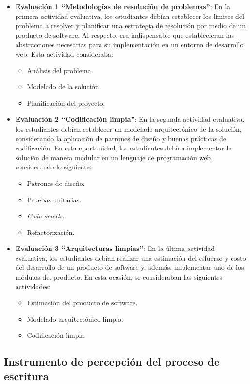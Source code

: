 \documentclass[spanish]{textolivre}
\begin{document}
\begin{itemize}
    \item \textbf{Evaluación 1 “Metodologías de resolución de problemas”}: En la primera actividad evaluativa, los estudiantes debían establecer los límites del problema a resolver y planificar una estrategia de resolución por medio de un producto de software. Al respecto, era indispensable que establecieran las abstracciones necesarias para su implementación en un entorno de desarrollo web. Esta actividad consideraba:
    \begin{itemize}
        \item Análisis del problema.
        \item Modelado de la solución.
        \item Planificación del proyecto.
    \end{itemize}
    \item \textbf{Evaluación 2 “Codificación limpia”}: En la segunda actividad evaluativa, los estudiantes debían establecer un modelado arquitectónico de la solución, considerando la aplicación de patrones de diseño y buenas prácticas de codificación. En esta oportunidad, los estudiantes debían implementar la solución de manera modular en un lenguaje de programación web, considerando lo siguiente:
    \begin{itemize}
        \item Patrones de diseño.
        \item Pruebas unitarias.
        \item \textit{Code smells}.
        \item Refactorización.
    \end{itemize}
    \item \textbf{Evaluación 3 “Arquitecturas limpias”}: En la última actividad evaluativa, los estudiantes debían realizar una estimación del esfuerzo y costo del desarrollo de un producto de software y, además, implementar uno de los módulos del producto. En esta ocasión, se consideraban las siguientes actividades:
    \begin{itemize}
        \item Estimación del producto de software.
        \item Modelado arquitectónico limpio.
        \item Codificación limpia.
    \end{itemize}
\end{itemize}

\subsection{Instrumento de percepción del proceso de escritura}
\end{document}
